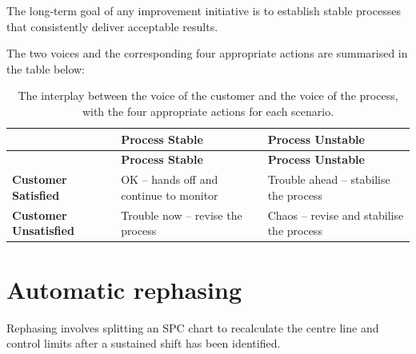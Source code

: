 \documentclass[
]{book}
\begin{document}
The long-term goal of any improvement initiative is to establish stable processes that consistently deliver acceptable results.

The two voices and the corresponding four appropriate actions are summarised in the table below:

\begin{longtable}[]{@{}
  >{\raggedright\arraybackslash}p{}
  >{\raggedright\arraybackslash}p{}
  >{\raggedright\arraybackslash}p{}@{}}
\caption{The interplay between the voice of the customer and the voice of the process, with the four appropriate actions for each scenario.}\tabularnewline
\toprule\noalign{}
\begin{minipage}[b]{\linewidth}\raggedright
\end{minipage} & \begin{minipage}[b]{\linewidth}\raggedright
\textbf{Process Stable}
\end{minipage} & \begin{minipage}[b]{\linewidth}\raggedright
\textbf{Process Unstable}
\end{minipage} \\
\midrule\noalign{}
\endfirsthead
\toprule\noalign{}
\begin{minipage}[b]{\linewidth}\raggedright
\end{minipage} & \begin{minipage}[b]{\linewidth}\raggedright
\textbf{Process Stable}
\end{minipage} & \begin{minipage}[b]{\linewidth}\raggedright
\textbf{Process Unstable}
\end{minipage} \\
\midrule\noalign{}
\endhead
\bottomrule\noalign{}
\endlastfoot
\textbf{Customer Satisfied} & OK -- hands off and continue to monitor & Trouble ahead -- stabilise the process \\
\textbf{Customer Unsatisfied} & Trouble now -- revise the process & Chaos -- revise and stabilise the process \\
\end{longtable}

\section{Automatic rephasing}\label{automatic-rephasing}

Rephasing involves splitting an SPC chart to recalculate the centre line and control limits after a sustained shift has been identified.
\end{document}

